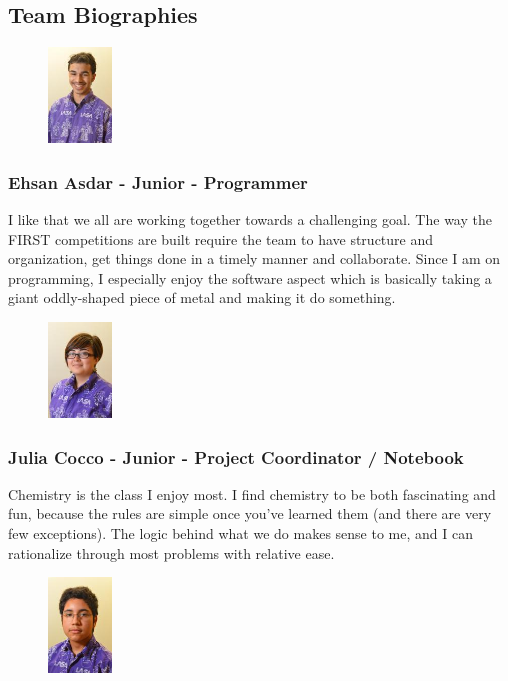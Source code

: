 \clearpage
\newpage

\subsection{Team Biographies}
\begin{figure}
	\centering
	\includegraphics[height=1in]{ehsan}
\end{figure}
\subsubsection{Ehsan Asdar - Junior - Programmer} 
I like that we all are working together towards a challenging goal. The way the FIRST competitions are built require the team to have structure and organization, get things done in a timely manner and collaborate. Since I am on programming, I especially enjoy the software aspect which is basically taking a giant oddly-shaped piece of metal and making it do something.

\begin{figure}
	\centering
	\includegraphics[height=1in]{julia}
\end{figure}
\subsubsection{Julia Cocco - Junior - Project Coordinator / Notebook}
Chemistry is the class I enjoy most. I find chemistry to be both fascinating and fun, because the rules are simple once you've learned them (and there are very few exceptions). The logic behind what we do makes sense to me, and I can rationalize through most problems with relative ease.

\begin{figure}
	\centering
	\includegraphics[height=1in]{izzy}
\end{figure}
